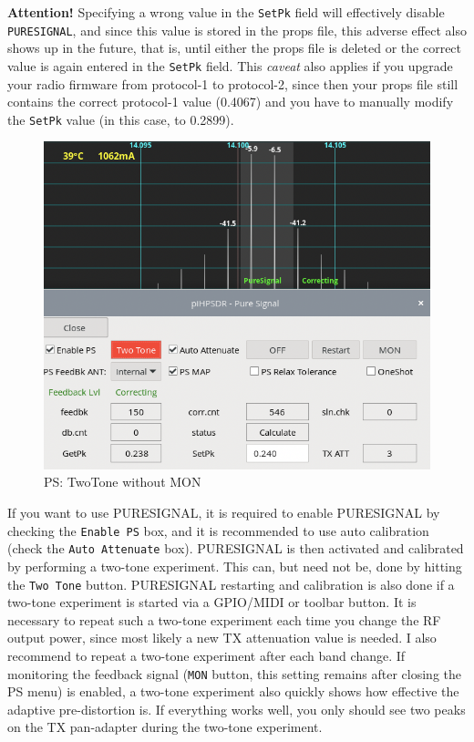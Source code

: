 \documentclass[12pt]{book}
\def\rett#1{\texttt{\color{red}#1}}
\begin{document}
\textbf{Attention!} Specifying a wrong value in the \rett{SetPk} field will effectively
disable \texttt{PURESIGNAL}, and since this value is stored in the props file, this
adverse effect also shows up in the future, that is, until either the props file is deleted
or the correct value is again entered in the \rett{SetPk} field. This \textit{caveat} also
applies if you upgrade your radio firmware from protocol-1 to protocol-2, since then your props
file still contains the correct protocol-1 value (0.4067) and you have
to manually modify the \rett{SetPk} value (in this case, to 0.2899).

\begin{figure}[t!]
\center
\includegraphics[scale=0.45]{PSnomon.png}
\caption{PS: TwoTone without MON}
\label{fig:PSnomon}
\end{figure}

If you want to use PURESIGNAL, it is required to enable PURESIGNAL by checking the
\rett{Enable PS} box, and it is recommended to use auto calibration (check the
\rett{Auto Attenuate} box). PURESIGNAL is then activated and calibrated by
performing a two-tone experiment. This can, but need not be, done by hitting
the \rett{Two Tone} button. PURESIGNAL restarting and calibration is also done
if a two-tone experiment is started via a GPIO/MIDI or toolbar button.
It is necessary to repeat such a two-tone experiment each time you change the
RF output power, since most likely a new TX attenuation value is needed. I also
recommend to repeat a two-tone experiment after each band change. If monitoring
the feedback signal (\rett{MON} button, this setting remains after closing the
PS menu) is enabled, a two-tone experiment also quickly shows how effective
the adaptive pre-distortion is. If everything works well, you only should see
two peaks on the TX pan-adapter during the two-tone experiment.
\end{document}
